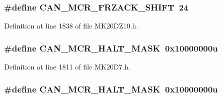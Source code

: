\subsubsection[{\texorpdfstring{C\+A\+N\+\_\+\+M\+C\+R\+\_\+\+F\+R\+Z\+A\+C\+K\+\_\+\+S\+H\+I\+FT}{CAN_MCR_FRZACK_SHIFT}}]{\setlength{\rightskip}{0pt plus 5cm}\#define C\+A\+N\+\_\+\+M\+C\+R\+\_\+\+F\+R\+Z\+A\+C\+K\+\_\+\+S\+H\+I\+FT~24}\hypertarget{group___c_a_n___register___masks_ga666c7d11b911c7803d94b85ba54a05c3}{}\label{group___c_a_n___register___masks_ga666c7d11b911c7803d94b85ba54a05c3}


Definition at line 1838 of file M\+K20\+D\+Z10.\+h.

\subsubsection[{\texorpdfstring{C\+A\+N\+\_\+\+M\+C\+R\+\_\+\+H\+A\+L\+T\+\_\+\+M\+A\+SK}{CAN_MCR_HALT_MASK}}]{\setlength{\rightskip}{0pt plus 5cm}\#define C\+A\+N\+\_\+\+M\+C\+R\+\_\+\+H\+A\+L\+T\+\_\+\+M\+A\+SK~0x10000000u}\hypertarget{group___c_a_n___register___masks_gad5282ba01498ad05fa9ce4387050f1df}{}\label{group___c_a_n___register___masks_gad5282ba01498ad05fa9ce4387050f1df}


Definition at line 1811 of file M\+K20\+D7.\+h.

\subsubsection[{\texorpdfstring{C\+A\+N\+\_\+\+M\+C\+R\+\_\+\+H\+A\+L\+T\+\_\+\+M\+A\+SK}{CAN_MCR_HALT_MASK}}]{\setlength{\rightskip}{0pt plus 5cm}\#define C\+A\+N\+\_\+\+M\+C\+R\+\_\+\+H\+A\+L\+T\+\_\+\+M\+A\+SK~0x10000000u}\hypertarget{group___c_a_n___register___masks_gad5282ba01498ad05fa9ce4387050f1df}{}\label{group___c_a_n___register___masks_gad5282ba01498ad05fa9ce4387050f1df}


